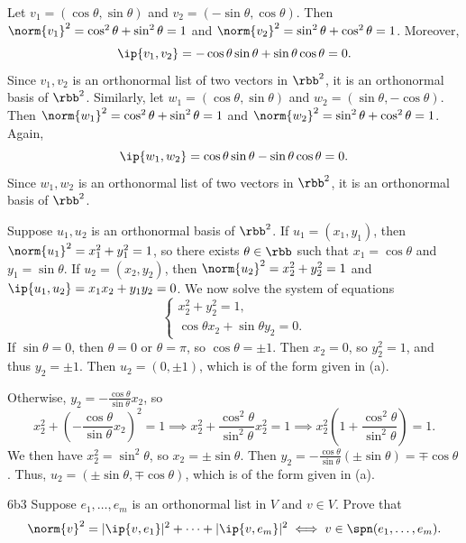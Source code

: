 \begin{solenum}
    \item Let $v_1 = (\cos\theta, \sin\theta)$ and $v_2 = (-\sin\theta, \cos\theta)$.
    Then $\norm{v_1}^2 = \cos^2\theta + \sin^2\theta = 1$ and $\norm{v_2}^2 = \sin^2\theta + \cos^2\theta = 1$.
    Moreover,
    \[
        \ip{v_1, v_2} = -\cos\theta\sin\theta + \sin\theta\cos\theta = 0.
    \]
    Since $v_1, v_2$ is an orthonormal list of two vectors in $\rbb^2$, it is an orthonormal basis of $\rbb^2$.
    Similarly, let $w_1 = (\cos\theta, \sin\theta)$ and $w_2 = (\sin\theta, -\cos\theta)$.
    Then $\norm{w_1}^2 = \cos^2\theta + \sin^2\theta = 1$ and $\norm{w_2}^2 = \sin^2\theta + \cos^2\theta = 1$.
    Again,
    \[
        \ip{w_1, w_2} = \cos\theta\sin\theta - \sin\theta\cos\theta = 0.
    \]
    Since $w_1, w_2$ is an orthonormal list of two vectors in $\rbb^2$, it is an orthonormal basis of $\rbb^2$.
    \item Suppose $u_1, u_2$ is an orthonormal basis of $\rbb^2$.
    If $u_1 = (x_1, y_1)$, then $\norm{u_1}^2 = x_1^2 + y_1^2 = 1$, so there exists $\theta \in \rbb$ such that $x_1 = \cos\theta$ and $y_1 = \sin\theta$.
    If $u_2 = (x_2, y_2)$, then $\norm{u_2}^2 = x_2^2 + y_2^2 = 1$ and $\ip{u_1, u_2} = x_1x_2 + y_1y_2 = 0$.
    We now solve the system of equations
    \[
        \begin{cases}
            x_2^2 + y_2^2 = 1, \\
            \cos\theta x_2 + \sin\theta y_2 = 0.
        \end{cases}
    \]
    If $\sin\theta = 0$, then $\theta = 0$ or $\theta = \pi$, so $\cos\theta = \pm 1$.
    Then $x_2 = 0$, so $y_2^2 = 1$, and thus $y_2 = \pm 1$.
    Then $u_2 = (0, \pm 1)$, which is of the form given in (a).
    
    Otherwise, $y_2 = -\frac{\cos\theta}{\sin\theta}x_2$, so
    \[
        x_2^2 + \left(-\frac{\cos\theta}{\sin\theta}x_2\right)^2 = 1 \implies x_2^2 + \frac{\cos^2\theta}{\sin^2\theta}x_2^2 = 1 \implies x_2^2\left(1 + \frac{\cos^2\theta}{\sin^2\theta}\right) = 1.
    \]
    We then have $x_2^2 = \sin^2\theta$, so $x_2 = \pm \sin\theta$.
    Then $y_2 = -\frac{\cos\theta}{\sin\theta}(\pm \sin\theta) = \mp \cos\theta$.
    Thus, $u_2 = (\pm \sin\theta, \mp \cos\theta)$, which is of the form given in (a).
\end{solenum}

\begin{exercise}{6b3}
    Suppose $e_1, \ldots, e_m$ is an orthonormal list in $V$ and $v \in V$.
    Prove that
    \[
        \norm{v}^2 = |\ip{v, e_1}|^2 + \cdots + |\ip{v, e_m}|^2 \iff v \in \spn(e_1, \ldots, e_m).
    \]
\end{exercise}

